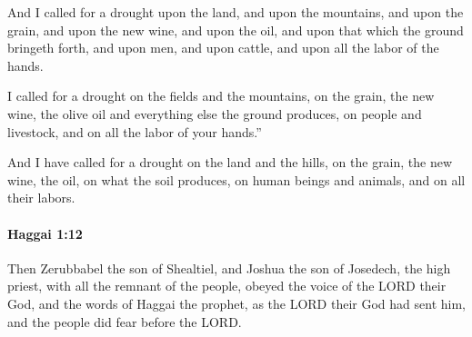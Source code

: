 			\begin{versebox}
					\item[BHS] 
					\item[LXX] 
					\item[ASV] And I called for a drought upon the land, and upon the mountains, and upon the grain, and upon the new wine, and upon the oil, and upon that which the ground bringeth forth, and upon men, and upon cattle, and upon all the labor of the hands.
					\item[NIV] I called for a drought on the fields and the mountains, on the grain, the new wine, the olive oil and everything else the ground produces, on people and livestock, and on all the labor of your hands.”
					\item[NRSV] And I have called for a drought on the land and the hills, on the grain, the new wine, the oil, on what the soil produces, on human beings and animals, and on all their labors.
			\end{versebox}

		\paragraph{Haggai 1:12} %
			\label{HAGGAI-1-12}

			Then Zerubbabel the son of Shealtiel, and Joshua the son of Josedech, the high priest, with all the remnant of the people, obeyed the voice of the LORD their God, and the words of Haggai the prophet, as the LORD their God had sent him, and the people did fear before the LORD.

